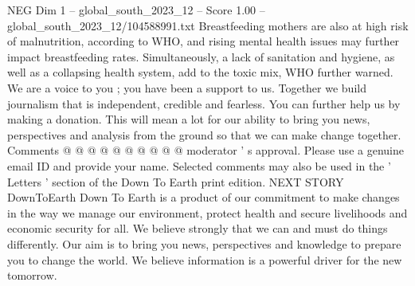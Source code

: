\begin{textsample}{NEG Dim 1 – global\_south\_2023\_12 – Score 1.00 – global\_south\_2023\_12/104588991.txt}
Breastfeeding mothers are also at high risk of malnutrition, according to WHO, and rising mental health issues may further impact breastfeeding rates.
Simultaneously, a lack of sanitation and hygiene, as well as a collapsing health system, add to the toxic mix, WHO further warned.
We are a voice to you ; you have been a support to us.
Together we build journalism that is independent, credible and fearless.
You can further help us by making a donation.
This will mean a lot for our ability to bring you news, perspectives and analysis from the ground so that we can make change together.
Comments @ @ @ @ @ @ @ @ @ @ moderator ' s approval.
Please use a genuine email ID and provide your name.
Selected comments may also be used in the ' Letters ' section of the Down To Earth print edition.
NEXT STORY DownToEarth Down To Earth is a product of our commitment to make changes in the way we manage our environment, protect health and secure livelihoods and economic security for all.
We believe strongly that we can and must do things differently.
Our aim is to bring you news, perspectives and knowledge to prepare you to change the world.
We believe information is a powerful driver for the new tomorrow.

\end{textsample}

